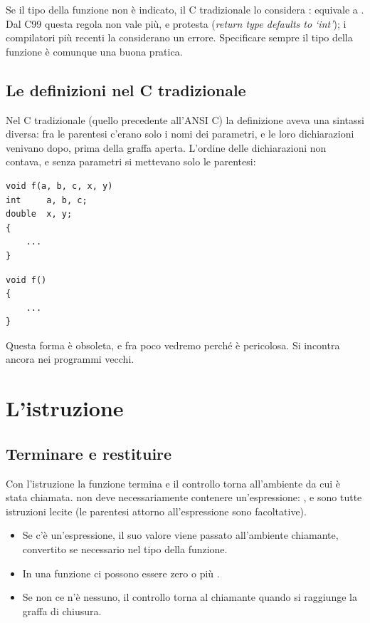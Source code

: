 Se il tipo della funzione non è indicato, il C tradizionale lo considera
:  equivale a
. Dal C99 questa regola non vale più, e
 protesta (\textit{return type defaults to ‘int’}); i compilatori
più recenti la considerano un errore. Specificare sempre il tipo della
funzione è comunque una buona pratica.

\subsection{Le definizioni nel C tradizionale}

Nel C tradizionale (quello precedente all'ANSI C) la definizione aveva una
sintassi diversa: fra le parentesi c'erano solo i nomi dei parametri, e le
loro dichiarazioni venivano dopo, prima della graffa aperta. L'ordine delle
dichiarazioni non contava, e senza parametri si mettevano solo le parentesi:

\begin{affianco}[0.5][c]
\begin{lstlisting}[style=c]
void f(a, b, c, x, y)
int     a, b, c;
double  x, y;
{
    ...
}
\end{lstlisting}
\risultato
\begin{lstlisting}[style=c]
void f()
{
    ...
}
\end{lstlisting}
\end{affianco}

Questa forma è obsoleta, e fra poco vedremo perché è pericolosa. Si
incontra ancora nei programmi vecchi.

\section{L'istruzione }

\subsection{Terminare e restituire}

Con l'istruzione  la funzione termina e il controllo torna
all'ambiente da cui è stata chiamata.  non deve
necessariamente contenere un'espressione: ,
 e  sono tutte istruzioni lecite (le
parentesi attorno all'espressione sono facoltative).

\begin{itemize}
  \item Se c'è un'espressione, il suo valore viene passato all'ambiente
        chiamante, convertito se necessario nel tipo della funzione.
  \item In una funzione ci possono essere zero o più .
  \item Se non ce n'è nessuno, il controllo torna al chiamante quando si
        raggiunge la graffa di chiusura.
\end{itemize}

